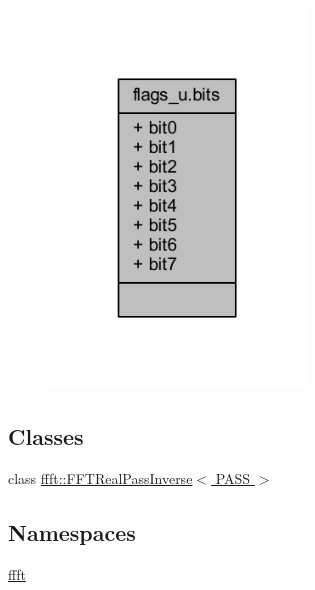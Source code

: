 \begin{figure}[H]
\begin{center}
\leavevmode
\includegraphics[width=194pt]{db/d12/a00268}
\end{center}
\end{figure}
\subsection*{Classes}
\begin{DoxyCompactItemize}
\item 
class \hyperlink{a00014}{ffft\+::\+F\+F\+T\+Real\+Pass\+Inverse$<$ P\+A\+S\+S $>$}
\end{DoxyCompactItemize}
\subsection*{Namespaces}
\begin{DoxyCompactItemize}
\item 
 \hyperlink{a00142}{ffft}
\end{DoxyCompactItemize}
